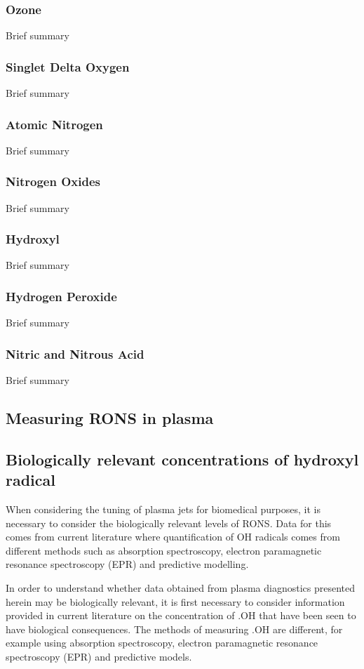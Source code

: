 \documentclass[11pt, oneside]{article}   	%
\begin{document}
\subsubsection{Ozone}
Brief summary
\subsubsection{Singlet Delta Oxygen}
Brief summary
\subsubsection{Atomic Nitrogen}
Brief summary
\subsubsection{Nitrogen Oxides}
Brief summary
\subsubsection{Hydroxyl}
Brief summary
\subsubsection{Hydrogen Peroxide}
Brief summary
\subsubsection{Nitric and Nitrous Acid}
Brief summary

\subsection{Measuring RONS in plasma}

\subsection{Biologically relevant concentrations of hydroxyl radical}

When considering the tuning of plasma jets for biomedical purposes, it is necessary to consider the biologically relevant levels of RONS.
Data for this comes from current literature where quantification of OH radicals comes from different methods such as absorption spectroscopy, electron paramagnetic resonance spectroscopy (EPR) and predictive modelling.

In order to understand whether data obtained from plasma diagnostics presented herein may be biologically relevant, it is first necessary to consider information provided in current literature on the concentration of .OH that have been seen to have biological consequences. The methods of measuring .OH are different, for example using absorption spectroscopy, electron paramagnetic resonance spectroscopy (EPR) and predictive models.
\end{document}

